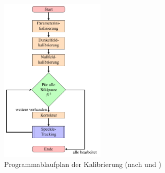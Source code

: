 \begin{figure}[htbp]
	\centering
	\includegraphics[width=0.45\textwidth]{pdf/graph_init}
	\caption[Kalibrierung]{Programmablaufplan der Kalibrierung (nach  und \cite{Coj17})}
	\label{fig:graph_kalibrierung}
\end{figure}

